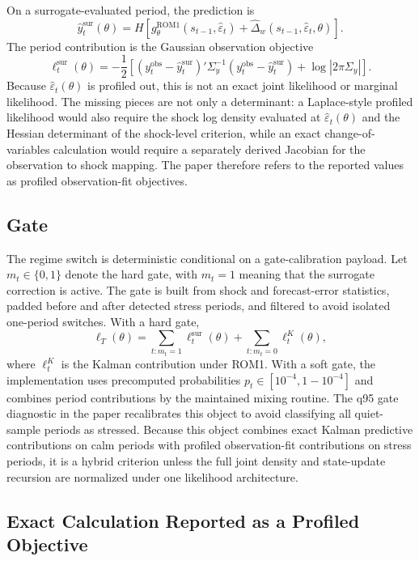 \documentclass[12pt]{article}
\newcommand{\eps}{\varepsilon}
\newcommand{\Sigmay}{\Sigma_y}
\newcommand{\rom}{\mathrm{ROM1}}
\newcommand{\sur}{\mathrm{sur}}
\newcommand{\obs}{\mathrm{obs}}
\begin{document}
On a surrogate-evaluated period, the prediction is
\[
  \widehat y_t^{\sur}(\theta)
  =
  H\left[
    g^{\rom}_\theta(s_{t-1},\widehat{\eps}_t)
    +
    \widehat{\Delta}_w(s_{t-1},\widehat{\eps}_t,\theta)
  \right].
\]
The period contribution is the Gaussian observation objective
\begin{equation}
  \ell_t^{\sur}(\theta)
  =
  -\frac{1}{2}
  \left[
    (y_t^{\obs}-\widehat y_t^{\sur})'
      \Sigmay^{-1}
    (y_t^{\obs}-\widehat y_t^{\sur})
    +
    \log |2\pi \Sigmay|
  \right].
\label{eq:tech_sur_objective}
\end{equation}
Because \(\widehat{\eps}_t(\theta)\) is profiled out, this is not an exact
joint likelihood or marginal likelihood. The missing pieces are not only a
determinant: a Laplace-style profiled likelihood would also require the shock
log density evaluated at \(\widehat{\eps}_t(\theta)\) and the Hessian
determinant of the shock-level criterion, while an exact change-of-variables
calculation would require a separately derived Jacobian for the observation to
shock mapping. The paper therefore refers to the reported values as profiled
observation-fit objectives.

\subsection{Gate}

The regime switch is deterministic conditional on a gate-calibration payload.
Let \(m_t\in\{0,1\}\) denote the hard gate, with \(m_t=1\) meaning that the
surrogate correction is active. The gate is built from shock and forecast-error
statistics, padded before and after detected stress periods, and filtered to
avoid isolated one-period switches. With a hard gate,
\[
  \ell_T(\theta)
  =
  \sum_{t:m_t=1} \ell_t^{\sur}(\theta)
  +
  \sum_{t:m_t=0} \ell_t^{K}(\theta),
\]
where \(\ell_t^K\) is the Kalman contribution under ROM1. With a soft gate, the
implementation uses precomputed probabilities \(p_t\in[10^{-4},1-10^{-4}]\)
and combines period contributions by the maintained mixing routine. The q95
gate diagnostic in the paper recalibrates this object to avoid classifying all
quiet-sample periods as stressed. Because this object combines exact Kalman
predictive contributions on calm periods with profiled observation-fit
contributions on stress periods, it is a hybrid criterion unless the full joint
density and state-update recursion are normalized under one likelihood
architecture.

\subsection{Exact Calculation Reported as a Profiled Objective}
\label{apptech:objective_calculation}
\end{document}
